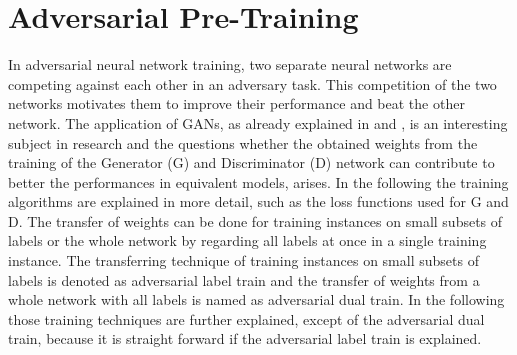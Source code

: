 
\section{Adversarial Pre-Training}\label{sec:nn_adv}
\thesisStateRevised
In adversarial neural network training, two separate neural networks are competing against each other in an adversary task.
This competition of the two networks motivates them to improve their performance and beat the other network.
The application of GANs, as already explained in  and , is an interesting subject in research and the questions whether the obtained weights from the training of the Generator (G) and Discriminator (D) network can contribute to better the performances in equivalent models, arises.
In the following the training algorithms are explained in more detail, such as the loss functions used for G and D.
The transfer of weights can be done for training instances on small subsets of labels or the whole network by regarding all labels at once in a single training instance.
The transferring technique of training instances on small subsets of labels is denoted as adversarial label train and the transfer of weights from a whole network with all labels is named as adversarial dual train.
In the following those training techniques are further explained, except of the adversarial dual train, because it is straight forward if the adversarial label train is explained.


